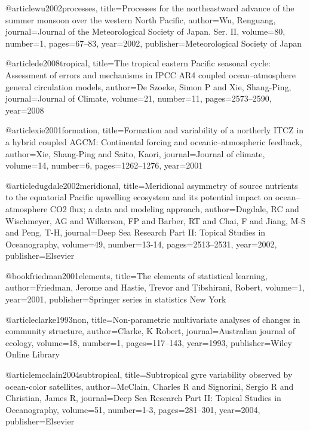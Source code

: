 {@article{wu2002processes,
  title={Processes for the northeastward advance of the summer monsoon over the western North Pacific},
  author={Wu, Renguang},
  journal={Journal of the Meteorological Society of Japan. Ser. II},
  volume={80},
  number={1},
  pages={67--83},
  year={2002},
  publisher={Meteorological Society of Japan}
}

@article{de2008tropical,
  title={The tropical eastern Pacific seasonal cycle: Assessment of errors and mechanisms in IPCC AR4 coupled ocean--atmosphere general circulation models},
  author={De Szoeke, Simon P and Xie, Shang-Ping},
  journal={Journal of Climate},
  volume={21},
  number={11},
  pages={2573--2590},
  year={2008}
}

@article{xie2001formation,
  title={Formation and variability of a northerly ITCZ in a hybrid coupled AGCM: Continental forcing and oceanic--atmospheric feedback},
  author={Xie, Shang-Ping and Saito, Kaori},
  journal={Journal of climate},
  volume={14},
  number={6},
  pages={1262--1276},
  year={2001}
}


@article{dugdale2002meridional,
  title={Meridional asymmetry of source nutrients to the equatorial Pacific upwelling ecosystem and its potential impact on ocean--atmosphere CO2 flux; a data and modeling approach},
  author={Dugdale, RC and Wischmeyer, AG and Wilkerson, FP and Barber, RT and Chai, F and Jiang, M-S and Peng, T-H},
  journal={Deep Sea Research Part II: Topical Studies in Oceanography},
  volume={49},
  number={13-14},
  pages={2513--2531},
  year={2002},
  publisher={Elsevier}
}

@book{friedman2001elements,
  title={The elements of statistical learning},
  author={Friedman, Jerome and Hastie, Trevor and Tibshirani, Robert},
  volume={1},
  year={2001},
  publisher={Springer series in statistics New York}
}

@article{clarke1993non,
  title={Non-parametric multivariate analyses of changes in community structure},
  author={Clarke, K Robert},
  journal={Australian journal of ecology},
  volume={18},
  number={1},
  pages={117--143},
  year={1993},
  publisher={Wiley Online Library}
}


@article{mcclain2004subtropical,
  title={Subtropical gyre variability observed by ocean-color satellites},
  author={McClain, Charles R and Signorini, Sergio R and Christian, James R},
  journal={Deep Sea Research Part II: Topical Studies in Oceanography},
  volume={51},
  number={1-3},
  pages={281--301},
  year={2004},
  publisher={Elsevier}
}

}
